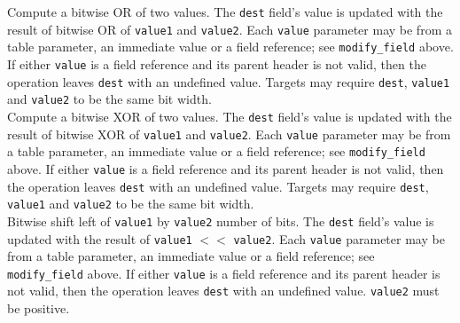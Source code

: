 \documentclass[12pt]{article}
\begin{document}

{ %
Compute a bitwise OR of two values.
}
{ %
}
{ %
The \texttt{dest} field's value is updated with the result of bitwise OR of
\texttt{value1} and \texttt{value2}. Each \texttt{value} parameter may be from a
table parameter, an immediate value or a field reference; see \texttt{modify_field} above. If either \texttt{value}
is a field reference and its parent header is not valid, then the operation
leaves \texttt{dest} with an undefined value.
Targets may require \texttt{dest}, \texttt{value1} and \texttt{value2} to
be the same bit width.
}\\


{ %
Compute a bitwise XOR of two values.
}
{ %
}
{ %
The \texttt{dest} field's value is updated with the result of bitwise XOR of
\texttt{value1} and \texttt{value2}. Each \texttt{value} parameter may be from a
table parameter, an immediate value or a field reference; see \texttt{modify_field} above. If either \texttt{value}
is a field reference and its parent header is not valid, then the operation
leaves \texttt{dest} with an undefined value.
Targets may require \texttt{dest}, \texttt{value1} and \texttt{value2} to
be the same bit width.
}\\


{ %
Bitwise shift left of \texttt{value1} by \texttt{value2} number of bits.
}
{ %
}
{ %
The \texttt{dest} field's value is updated with the result of
\texttt{value1} $<<$ \texttt{value2}. Each \texttt{value} parameter may be from a
table parameter, an immediate value or a field reference; see \texttt{modify_field} above. If either \texttt{value}
is a field reference and its parent header is not valid, then the operation
leaves \texttt{dest} with an undefined value. \texttt{value2} must be positive.
}\\
\end{document}
